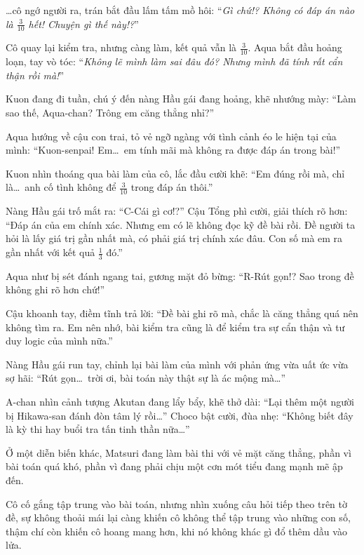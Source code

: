 \documentclass[../main.tex]{subfiles}
\begin{document}
\dots cô ngớ người ra, trán bắt đầu lấm tấm mồ hôi: ``\textit{Gì chứ!? Không có đáp án nào là \(\frac{3}{10}\) hết! Chuyện gì thế này!?}''

Cô quay lại kiểm tra, nhưng càng làm, kết quả vẫn là \(\frac{3}{10}\). Aqua bắt đầu hoảng loạn, tay vò tóc: ``\textit{Không lẽ mình làm sai đâu đó? Nhưng mình đã tính rất cẩn thận rồi mà!}''

Kuon đang đi tuần, chú ý đến nàng Hầu gái đang hoảng, khẽ nhướng mày: ``Làm sao thế, Aqua-chan? Trông em căng thẳng nhỉ?''

Aqua hướng về cậu con trai, tỏ vẻ ngỡ ngàng với tình cảnh éo le hiện tại của mình: ``Kuon-senpai! Em\dots\ em tính mãi mà không ra được đáp án trong bài!''

Kuon nhìn thoáng qua bài làm của cô, lắc đầu cười khẽ: ``Em đúng rồi mà, chỉ là\dots\ anh cố tình không để \(\frac{3}{10}\) trong đáp án thôi.''

Nàng Hầu gái trố mắt ra: ``C-Cái gì cơ!?'' Cậu Tổng phì cười, giải thích rõ hơn: ``Đáp án của em chính xác. Nhưng em có lẽ không đọc kỹ đề bài rồi. Đề người ta hỏi là lấy giá trị gần nhất mà, có phải giá trị chính xác đâu. Con số mà em ra gần nhất với kết quả \(\frac{1}{3}\) đó.''

Aqua như bị sét đánh ngang tai, gương mặt đỏ bừng: ``R-Rút gọn!? Sao trong đề không ghi rõ hơn chứ!''

Cậu khoanh tay, điềm tĩnh trả lời: ``Đề bài ghi rõ mà, chắc là căng thẳng quá nên không tìm ra. Em nên nhớ, bài kiểm tra cũng là để kiểm tra sự cẩn thận và tư duy logic của mình nữa.''

Nàng Hầu gái run tay, chỉnh lại bài làm của mình với phản ứng vừa uất ức vừa sợ hãi: ``Rút gọn\dots\ trời ơi, bài toán này thật sự là ác mộng mà\dots''

A-chan nhìn cảnh tượng Akutan đang lẩy bẩy, khẽ thở dài: ``Lại thêm một người bị Hikawa-san đánh đòn tâm lý rồi\dots'' Choco bật cười, đùa nhẹ: ``Không biết đây là kỳ thi hay buổi tra tấn tinh thần nữa\dots''

\ct

Ở một diễn biến khác, Matsuri đang làm bài thi với vẻ mặt căng thẳng, phần vì bài toán quá khó, phần vì đang phải chịu một cơn mót tiểu đang mạnh mẽ ập đến.

Cô cố gắng tập trung vào bài toán, nhưng nhìn xuống câu hỏi tiếp theo trên tờ đề, sự không thoải mái lại càng khiến cô không thể tập trung vào những con số, thậm chí còn khiến cô hoang mang hơn, khi nó không khác gì đổ thêm dầu vào lửa.
\end{document}
